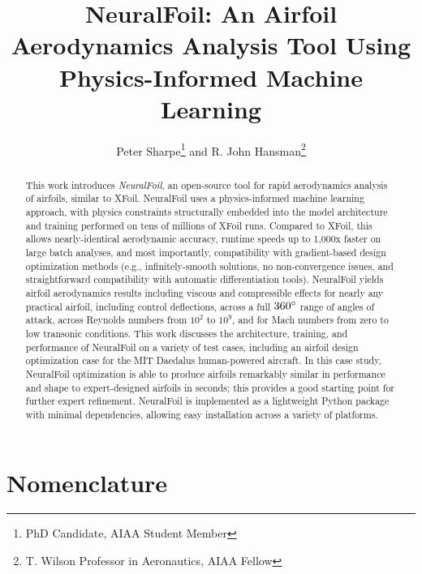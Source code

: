 \documentclass[conf]{new-aiaa}
\title{NeuralFoil: An Airfoil Aerodynamics Analysis Tool Using Physics-Informed Machine Learning}
\author{Peter Sharpe\footnote{PhD Candidate, AIAA Student Member} and R. John Hansman\footnote{T. Wilson Professor in Aeronautics, AIAA Fellow}}
\affil{Massachusetts Institute of Technology, Cambridge, MA}
\begin{document}
    \maketitle

    \begin{abstract}

        This work introduces \emph{NeuralFoil}, an open-source tool for rapid aerodynamics analysis of airfoils, similar to XFoil. NeuralFoil uses a physics-informed machine learning approach, with physics constraints structurally embedded into the model architecture and training performed on tens of millions of XFoil runs. Compared to XFoil, this allows nearly-identical aerodynamic accuracy, runtime speeds up to 1,000x faster on large batch analyses, and most importantly, compatibility with gradient-based design optimization methods (e.g., infinitely-smooth solutions, no non-convergence issues, and straightforward compatibility with automatic differentiation tools). NeuralFoil yields airfoil aerodynamics results including viscous and compressible effects for nearly any practical airfoil, including control deflections, across a full $360\degree$ range of angles of attack, across Reynolds numbers from $10^2$ to $10^9$, and for Mach numbers from zero to low transonic conditions. This work discusses the architecture, training, and performance of NeuralFoil on a variety of test cases, including an airfoil design optimization case for the MIT Daedalus human-powered aircraft. In this case study, NeuralFoil optimization is able to produce airfoils remarkably similar in performance and shape to expert-designed airfoils in seconds; this provides a good starting point for further expert refinement. NeuralFoil is implemented as a lightweight Python package with minimal dependencies, allowing easy installation across a variety of platforms.

    \end{abstract}

    \section{Nomenclature}
\end{document}
